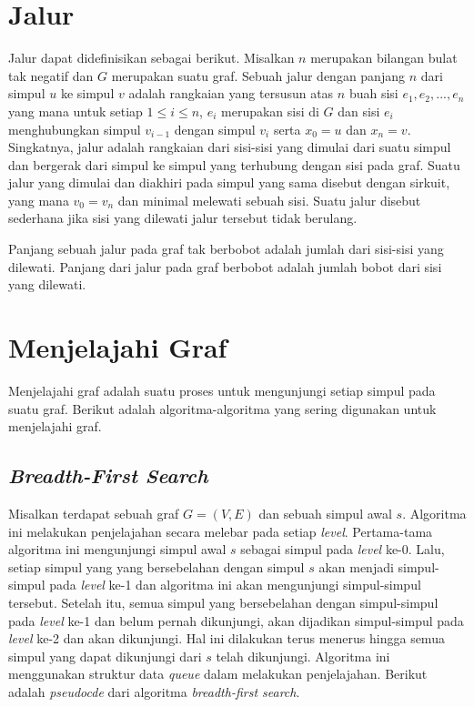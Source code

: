 \section{Jalur}

Jalur dapat didefinisikan sebagai berikut. Misalkan $n$ merupakan bilangan bulat tak negatif dan $G$ merupakan suatu graf. Sebuah jalur dengan 
panjang $n$ dari simpul $u$ ke simpul $v$ adalah rangkaian yang tersusun atas $n$ buah sisi $e_{1}, e_{2}, ..., e_{n}$ yang mana untuk setiap $1 \leq i \leq n$, $e_{i}$ merupakan sisi 
di $G$ dan sisi $e_{i}$ menghubungkan simpul $v_{i-1}$ dengan simpul $v_{i}$ serta $x_{0} = u$ dan $x_{n} = v$. Singkatnya, jalur adalah rangkaian dari sisi-sisi yang dimulai dari 
suatu simpul dan bergerak dari simpul ke simpul yang terhubung dengan sisi pada graf. Suatu jalur yang dimulai dan diakhiri pada simpul yang sama disebut 
dengan sirkuit, yang mana $v_{0} = v_{n}$ dan minimal melewati sebuah sisi. Suatu jalur disebut sederhana jika sisi yang dilewati jalur tersebut tidak berulang.

Panjang sebuah jalur pada graf tak berbobot adalah jumlah dari sisi-sisi yang dilewati. Panjang dari jalur pada graf berbobot adalah jumlah bobot dari sisi yang dilewati.

\section{Menjelajahi Graf}

Menjelajahi graf adalah suatu proses untuk mengunjungi setiap simpul pada suatu graf. Berikut adalah 
algoritma-algoritma yang sering digunakan untuk menjelajahi graf.

    \subsection{\textit{Breadth-First Search}}
    Misalkan terdapat sebuah graf $G = (V, E)$ dan sebuah simpul awal $s$. Algoritma ini melakukan penjelajahan secara melebar pada setiap \textit{level}. 
    Pertama-tama algoritma ini mengunjungi simpul awal $s$ sebagai simpul pada \textit{level} ke-0. Lalu, setiap simpul yang 
    yang bersebelahan dengan simpul $s$ akan menjadi simpul-simpul pada \textit{level} ke-1 dan algoritma ini akan mengunjungi 
    simpul-simpul tersebut. Setelah itu, semua simpul yang bersebelahan 
    dengan simpul-simpul pada \textit{level} ke-1 dan belum pernah dikunjungi, akan dijadikan simpul-simpul pada \textit{level} ke-2 dan 
    akan dikunjungi. Hal ini dilakukan terus menerus hingga semua simpul yang dapat dikunjungi dari $s$  telah dikunjungi.
    Algoritma ini menggunakan struktur data \textit{queue} dalam melakukan penjelajahan.
    Berikut adalah \textit{pseudocde} dari algoritma \textit{breadth-first search}.

